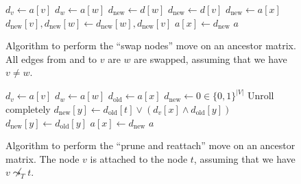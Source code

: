 \begin{figure}[p]
    \begin{algorithmic}[1]
            \State $d_v \leftarrow a[v]$
            \State $d_w \leftarrow a[w]$
                    \State $d_\mathrm{new} \leftarrow d[w]$
                    \State $d_\mathrm{new} \leftarrow d[v]$
                \Else
                    \State $d_\mathrm{new} \leftarrow a[x]$
                \EndIf
                \State $d_\mathrm{new}[v], d_\mathrm{new}[w] \leftarrow d_\mathrm{new}[w], d_\mathrm{new}[v]$
                \State $a[x] \leftarrow d_\mathrm{new}$
            \EndFor
            \State \Return $a$
        \EndFunction
    \end{algorithmic}
    \caption{Algorithm to perform the ``swap nodes'' move on an ancestor matrix. All edges from and to $v$ are $w$ are swapped, assuming that we have $v \neq w$.}
    \label{alg:am_swap_nodes}
\end{figure}

\begin{figure}[p]
    \begin{algorithmic}[1]
            \State $d_v \leftarrow a[v]$
            \State $d_w \leftarrow a[w]$
                \State $d_\mathrm{old} \leftarrow a[x]$
                \State $d_\mathrm{new} \leftarrow 0 \in \{0,1\}^{|V|}$
                 \Comment Unroll completely
                        \State $d_\mathrm{new}[y] \leftarrow d_\mathrm{old}[t] \vee (d_v[x] \wedge d_\mathrm{old}[y])$
                    \Else
                        \State $d_\mathrm{new}[y] \leftarrow d_\mathrm{old}[y]$
                    \EndIf
                \EndFor
                \State $a[x] \leftarrow d_\mathrm{new}$
            \EndFor
            \State \Return $a$
        \EndFunction
    \end{algorithmic}
    \caption{Algorithm to perform the ``prune and reattach'' move on an ancestor matrix. The node $v$ is attached to the node $t$, assuming that we have $v \not\leadsto_T t$.}
    \label{alg:am_prune_reattach}
\end{figure}

